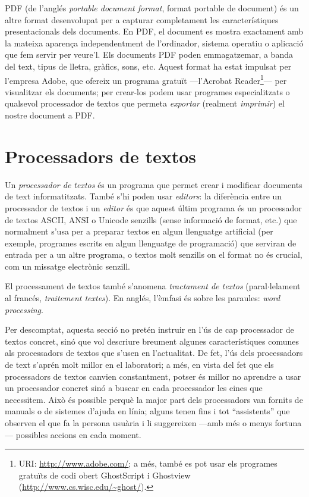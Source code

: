 PDF (de l'anglés \emph{portable document format}, format portable de
document) és un altre format desenvolupat per a capturar completament
les característiques presentacionals dels documents. En PDF, el
document es mostra exactament amb la mateixa aparença independentment
de l'ordinador, sistema operatiu o aplicació que fem servir per
veure'l. Els documents PDF poden emmagatzemar, a banda del text, tipus
de lletra, gràfics, sons, etc. Aquest format ha estat impulsat per
l'empresa Adobe, que ofereix un programa gratuït ---l'Acrobat
Reader\footnote{URI: \url{http://www.adobe.com/}; a més, també es
  pot usar els programes gratuïts de codi obert GhostScript i Ghostview
  (\url{http://www.cs.wisc.edu/~ghost/}).}--- per visualitzar els
documents; per crear-los podem usar programes especialitzats o
qualsevol processador de textos que permeta \emph{exportar} (realment
\emph{imprimir}) el nostre document a PDF.

\section{Processadors de textos}
\label{ss:proctext}

Un \emph{processador de textos} és un programa que permet crear i
modificar documents de text informatitzats. També s'hi poden usar {\em
  editors}: la diferència entre un processador de textos i un {\em
  editor} és que aquest últim programa és un processador de textos
ASCII,  ANSI o Unicode senzills (sense informació de format, etc.) que normalment s'usa
per a preparar textos en algun llenguatge artificial (per exemple,
programes escrits en algun llenguatge de programació) que serviran de
entrada per a un altre programa, o textos molt senzills on el format
no és crucial, com un missatge electrònic senzill.

El processament de textos també s'anomena \emph{tractament de
  textos} (paral$\cdot$le\-la\-ment al francés, \emph{traitement
  textes}). En anglés, l'èmfasi és sobre les paraules:
\emph{word processing}.

Per descomptat, aquesta secció no pretén instruir en l'ús de cap
processador de textos concret, sinó que vol descriure breument algunes
característiques comunes als processadors de textos que s'usen en
l'actualitat. De fet, l'ús dels processadors de text s'aprén molt
millor en el laboratori; a més, en vista del fet que els processadors
de textos canvien constantment, potser és millor no aprendre a usar un
processador concret sinó a buscar en cada processador les eines que
necessitem. Això és possible perquè la major part dels processadors
van fornits de manuals o de sistemes d'ajuda en línia; alguns tenen
fins i tot ``assistents'' que observen el que fa la persona usuària i
li suggereixen ---amb més o menys fortuna--- possibles accions en cada
moment.


